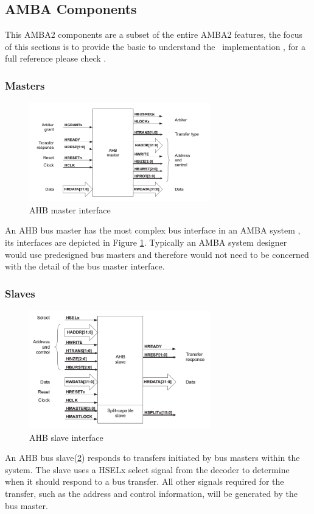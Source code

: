 \subsection{AMBA Components}
This AMBA2 components are a  subset of the entire AMBA2 features, the focus of this sections is to provide the basic to understand the \cshia~implementation , for a full reference please check \cite{ARMAMBA2}.

\subsubsection{Masters}
\begin{figure}[ht]
    \centering
    \includegraphics[width=0.7\textwidth]{figures/others/master_ahb.png}
    \caption{AHB master interface}
    \label{fig:masterint}
\end{figure}

 An AHB bus master has the most complex bus interface in an AMBA system , its interfaces are depicted in Figure \ref{fig:masterint}. Typically an AMBA system designer would use predesigned bus masters and therefore would not need to be concerned with the detail of the bus master interface.



\subsubsection{Slaves}

\begin{figure}[ht]
    \centering
    \includegraphics[width=0.7\textwidth]{figures/others/slave_ahb.png}
    \caption{AHB slave interface}
    \label{fig:slaveint}
\end{figure}
An AHB bus slave(\ref{fig:slaveint}) responds to transfers initiated by bus masters within the system. The slave uses a HSELx select signal from the decoder to determine when it should respond to a bus transfer. All other signals required for the transfer, such as the address and control information, will be generated by the bus master.
 
